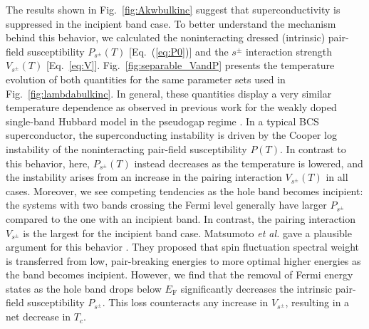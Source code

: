 \documentclass[prb,twocolumn,amsmath,amssymb,superscriptaddress,floatfix,nofootinbib]{revtex4-2}
\begin{document}
The results shown in Fig.~\ref{fig:Akwbulkinc} suggest that superconductivity is suppressed in the incipient band case. To better understand the mechanism behind this behavior, we calculated the noninteracting dressed (intrinsic) pair-field susceptibility $P_{s^\pm}(T)$ [Eq.~(\ref{eq:P0})] and the $s^\pm$ interaction strength $V_{s^\pm}(T)$ [Eq.~\ref{eq:V}]. Fig.~\ref{fig:separable_VandP} presents the temperature evolution of both quantities for the same parameter sets used in Fig.~\ref{fig:lambdabulkinc}. 
In general, these quantities display a very similar temperature dependence as observed in previous work for the weakly doped single-band Hubbard model in the pseudogap regime \cite{Maier2016}. In a typical BCS superconductor, the superconducting instability is driven by the Cooper log instability of the noninteracting pair-field susceptibility $P(T)$. In contrast to this behavior, here, $P_{s^\pm}(T)$ instead decreases as the temperature is lowered, and the instability arises from an increase in the pairing interaction $V_{s^\pm}(T)$ in all cases.  Moreover, we see competing tendencies as the hole band becomes incipient: the systems with two bands crossing the Fermi level generally have larger $P_{s^\pm}$ compared to the one with an incipient band. In contrast, the pairing interaction $V_{s^\pm}$ is the largest for the incipient band case. Matsumoto {\it et al.} gave a plausible argument for this behavior  \cite{KurokiFlex2020}. They proposed that spin fluctuation spectral weight is transferred from low, pair-breaking energies to more optimal higher energies as the band becomes incipient. However, we find that the removal of Fermi energy states as the hole band drops below $E_\mathrm{F}$ significantly decreases the intrinsic pair-field susceptibility $P_{s^\pm}$. This loss counteracts any increase in $V_{s^\pm}$, resulting in a net decrease in $T_c$.  
\end{document}
